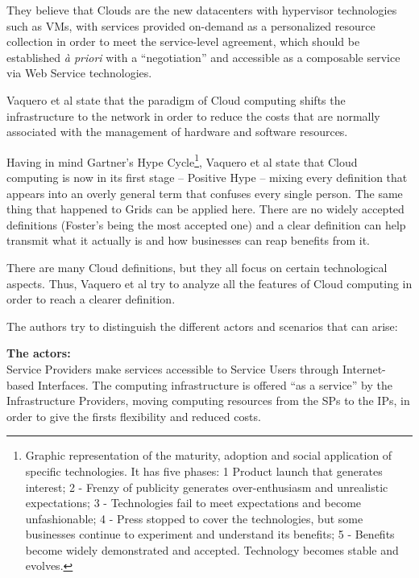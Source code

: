 They believe that Clouds are the new datacenters with hypervisor technologies such as VMs, with services provided on-demand as a personalized resource collection in order to meet the service-level agreement, which should be established \textit{à priori} with a ``negotiation'' and accessible as a composable service via Web Service technologies.


Vaquero et al state that the paradigm of Cloud computing shifts the infrastructure to the network in order to reduce the costs that are normally associated with the management of hardware and software resources.  

Having in mind Gartner’s Hype Cycle\footnote{Graphic representation of the maturity, adoption and social application of specific technologies. It has five phases: 1  Product launch that generates interest; 2 - Frenzy of publicity generates over-enthusiasm and unrealistic expectations; 3 - Technologies fail to meet expectations and become unfashionable; 4 - Press stopped to cover the technologies, but some businesses continue to experiment and understand its benefits; 5 - Benefits become widely demonstrated and accepted. Technology becomes stable and evolves.}, Vaquero et al state that Cloud computing is now in its first stage – Positive Hype – mixing every definition that appears into an overly general term that confuses every single person. The same thing that happened to Grids can be applied here. There are no widely accepted definitions (Foster’s being the most accepted one) and a clear definition can help transmit what it actually is and how businesses can reap benefits from it.

There are many Cloud definitions, but they all focus on certain technological aspects. Thus, Vaquero et al try to analyze all the features of Cloud computing in order to reach a clearer definition.

The authors try to distinguish the different actors and scenarios that can arise:


\textbf{The actors:}\\
Service Providers make services accessible to Service Users through Internet-based Interfaces. The computing infrastructure is offered “as a service” by the Infrastructure Providers, moving computing resources from the SPs to the IPs, in order to give the firsts flexibility and reduced costs.

